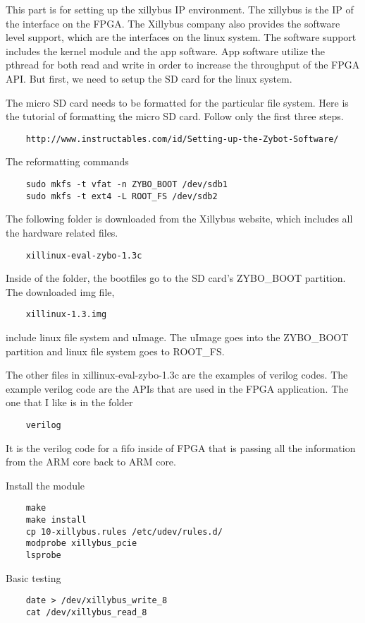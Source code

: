 This part is for setting up the xillybus IP environment. The xillybus is the IP of the interface on
the FPGA. The Xillybus company also provides the software level support, which are the interfaces on
the linux system. The software support includes the kernel module and the app software. App software
utilize the pthread for both read and write in order to increase the throughput of the FPGA API. But
first, we need to setup the SD card for the linux system.

The micro SD card needs to be formatted for the particular file system. Here is the tutorial of
formatting the micro SD card. Follow only the first three steps.

\begin{lstlisting}
    http://www.instructables.com/id/Setting-up-the-Zybot-Software/
\end{lstlisting}

The reformatting commands
\begin{lstlisting}
    sudo mkfs -t vfat -n ZYBO_BOOT /dev/sdb1
    sudo mkfs -t ext4 -L ROOT_FS /dev/sdb2
\end{lstlisting}


The following folder is downloaded from the Xillybus website, which includes all the hardware
related files.
\begin{lstlisting}
    xillinux-eval-zybo-1.3c
\end{lstlisting}

Inside of the folder, the bootfiles go to the SD card's ZYBO\_BOOT partition. The downloaded img file, 
\begin{lstlisting}
    xillinux-1.3.img
\end{lstlisting}
include linux file system and uImage. The uImage goes into the  ZYBO\_BOOT partition and linux file
system goes to ROOT\_FS.

The other files in xillinux-eval-zybo-1.3c are the examples of verilog codes. The example verilog
code are the APIs that are used in the FPGA application. The one that I like is in the folder
\begin{lstlisting}
    verilog
\end{lstlisting}
It is the verilog code for a fifo inside of FPGA that is passing all the information from the ARM
core back to ARM core.

Install the module 
\begin{lstlisting}
    make
    make install
    cp 10-xillybus.rules /etc/udev/rules.d/
    modprobe xillybus_pcie
    lsprobe
\end{lstlisting}

Basic testing 
\begin{lstlisting}
    date > /dev/xillybus_write_8
    cat /dev/xillybus_read_8
\end{lstlisting}

